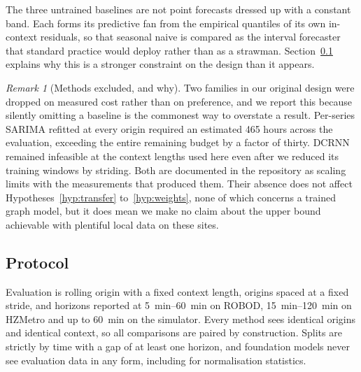 \documentclass[utf8]{FrontiersinHarvard}
\theoremstyle{plain}
\theoremstyle{definition}
\theoremstyle{remark}
\newtheorem{remark}[theorem]{Remark}
\begin{document}
The three untrained baselines are not point forecasts dressed up with a constant band. Each forms its predictive fan from the empirical quantiles of its own in-context residuals, so that seasonal naive is compared as the interval forecaster that standard practice would deploy rather than as a strawman. Section~\ref{sec:protocol} explains why this is a stronger constraint on the design than it appears.

\begin{remark}[Methods excluded, and why]
Two families in our original design were dropped on measured cost rather than on preference, and we report this because silently omitting a baseline is the commonest way to overstate a result. Per-series SARIMA refitted at every origin required an estimated \num{465} hours across the evaluation, exceeding the entire remaining budget by a factor of thirty. DCRNN \citep{li2018dcrnn} remained infeasible at the context lengths used here even after we reduced its training windows by striding. Both are documented in the repository as scaling limits with the measurements that produced them. Their absence does not affect Hypotheses~\ref{hyp:transfer} to~\ref{hyp:weights}, none of which concerns a trained graph model, but it does mean we make no claim about the upper bound achievable with plentiful local data on these sites.
\end{remark}

\subsection{Protocol}
\label{sec:protocol}

Evaluation is rolling origin with a fixed context length, origins spaced at a fixed stride, and horizons reported at \SIrange{5}{60}{\minute} on ROBOD, \SIrange{15}{120}{\minute} on HZMetro and up to \SI{60}{\minute} on the simulator. Every method sees identical origins and identical context, so all comparisons are paired by construction. Splits are strictly by time with a gap of at least one horizon, and foundation models never see evaluation data in any form, including for normalisation statistics.
\end{document}
